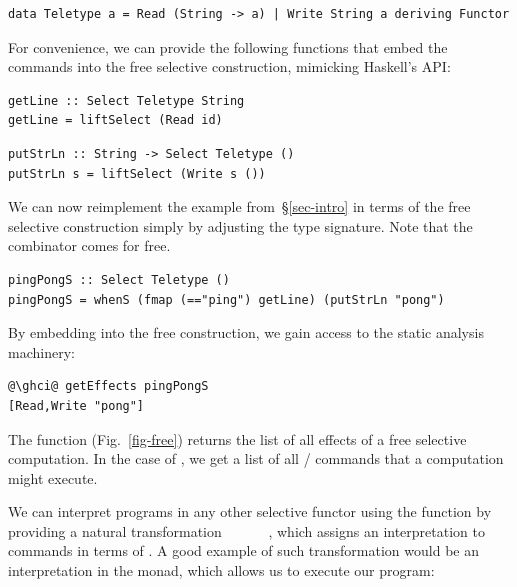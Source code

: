 \vspace{1mm}
\begin{verbatim}
data Teletype a = Read (String -> a) | Write String a deriving Functor
\end{verbatim}
\vspace{1mm}

\noindent
For convenience, we can provide the following functions that embed the commands
into the free selective construction, mimicking Haskell's  API:

\vspace{1mm}
\begin{verbatim}
getLine :: Select Teletype String
getLine = liftSelect (Read id)
\end{verbatim}
\vspace{0mm}
\begin{verbatim}
putStrLn :: String -> Select Teletype ()
putStrLn s = liftSelect (Write s ())
\end{verbatim}
\vspace{1mm}

\noindent
We can now reimplement the  example from~\S\ref{sec-intro} in
terms of the free selective construction simply by adjusting the type signature.
Note that the  combinator comes for free.

\vspace{1mm}
\begin{verbatim}
pingPongS :: Select Teletype ()
pingPongS = whenS (fmap (=="ping") getLine) (putStrLn "pong")
\end{verbatim}
\vspace{1mm}

\noindent
By embedding  into the free construction, we gain access to the
static analysis machinery:

\vspace{1mm}
\begin{verbatim}
@\ghci@ getEffects pingPongS
[Read,Write "pong"]
\end{verbatim}
\vspace{1mm}

\noindent
The function  (Fig.~\ref{fig-free}) returns the list of all
effects of a free selective computation. In the case of ,
we get a list of all / commands that a computation might
execute.

We can interpret  programs in any other selective functor using
the  function by providing a natural transformation
~~~~\hs{->}~~, which assigns an
interpretation to  commands in terms of . A good example of
such transformation would be an interpretation in the  monad, which
allows us to execute our  program:

